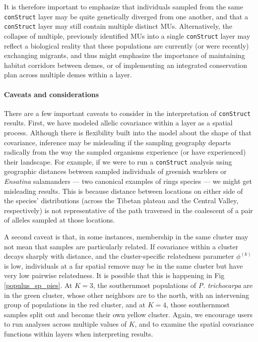 \documentclass[12pt]{article}
\begin{document}
It is therefore important to emphasize that individuals sampled from the same \texttt{conStruct} layer 
may be quite genetically diverged from one another, 
and that a \texttt{conStruct} layer may still contain multiple distinct MUs.  
Alternatively, the collapse of multiple, previously identified MUs into a single \texttt{conStruct} layer 
may reflect a biological reality that these populations are currently 
(or were recently) exchanging migrants, 
and thus might emphasize the importance of maintaining habitat corridors between demes, 
or of implementing an integrated conservation plan across multiple demes within a layer.

\paragraph{Caveats and considerations}
There are a few important caveats to consider in the interpretation of \texttt{conStruct} results. 
First, we have modeled allelic covariance within a layer as a spatial process.
Although there is flexibility built into the model about the shape of that covariance, 
inference may be misleading if the sampling geography departs radically from the way 
the sampled organisms experience (or have experienced) their landscape.
For example, if we were to run a \texttt{conStruct} analysis using geographic distances between 
sampled individuals of greenish warblers \citep{Irwin2001} or \textit{Ensatina} salamanders \citep{wake_schneider1998} 
--- two canonical examples of rings species --- 
we might get misleading results.
This is because distance between locations on either side of the species' distributions
(across the Tibetan plateau and the Central Valley, respectively) 
is not representative of the path traversed in the coalescent of a pair of alleles sampled at those locations.

A second caveat is that, in some instances, 
membership in the same cluster may not mean that samples are particularly related.
If covariance within a cluster decays sharply with distance, 
and the cluster-specific relatedness parameter $\phi^{(k)}$ is low, 
individuals at a far spatial remove may be in the same cluster but have very low pairwise relatedness.
It is possible that this is happening in Fig \ref{populus_sp_pies}. 
At $K=3$, the southernmost populations of \textit{P. trichocarpa} are in the green cluster, 
whose other neighbors are to the north, with an intervening group of populations in the red cluster, 
and at $K=4$, those southernmost samples split out and become their own yellow cluster.
Again, we encourage users to run analyses across multiple values of $K$, 
and to examine the spatial covariance functions within layers when interpreting results.
\end{document}
